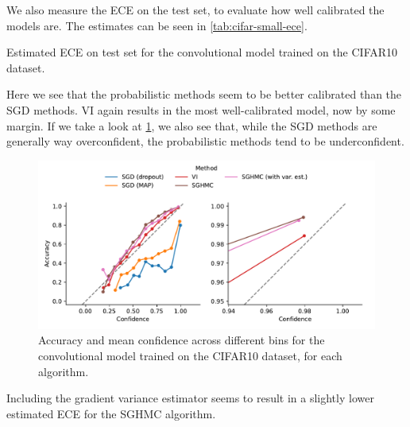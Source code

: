 We also measure the ECE on the test set, to evaluate how well calibrated the models are.
The estimates can be seen in \cref{tab:cifar-small-ece}.
\begin{table}[htbp]
    \centering
    
    \caption{Estimated ECE on test set for the convolutional model trained on the CIFAR10 dataset.}
    \label{tab:cifar-small-ece}
\end{table}
Here we see that the probabilistic methods seem to be better calibrated than the SGD methods.
VI again results in the most well-calibrated model, now by some margin.
If we take a look at \cref{fig:cifar-small-calibration}, we also see that, while the SGD methods are generally way overconfident, the probabilistic methods tend to be underconfident.
\begin{figure}[htbp]
    \centering
    \includegraphics[width=\linewidth]{Figures/cifar-small-calibration.pdf}
    \caption{Accuracy and mean confidence across different bins for the convolutional model trained on the CIFAR10 dataset, for each algorithm.}
    \label{fig:cifar-small-calibration}
\end{figure}
Including the gradient variance estimator seems to result in a slightly lower estimated ECE for the SGHMC algorithm.


